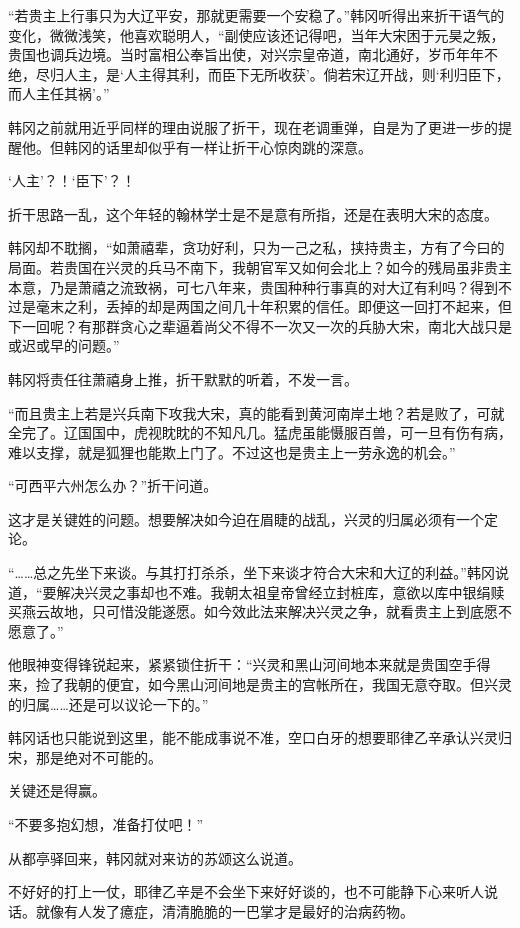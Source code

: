 “若贵主上行事只为大辽平安，那就更需要一个安稳了。”韩冈听得出来折干语气的变化，微微浅笑，他喜欢聪明人，“副使应该还记得吧，当年大宋困于元昊之叛，贵国也调兵边境。当时富相公奉旨出使，对兴宗皇帝道，南北通好，岁币年年不绝，尽归人主，是‘人主得其利，而臣下无所收获’。倘若宋辽开战，则‘利归臣下，而人主任其祸’。”

韩冈之前就用近乎同样的理由说服了折干，现在老调重弹，自是为了更进一步的提醒他。但韩冈的话里却似乎有一样让折干心惊肉跳的深意。

‘人主’？！‘臣下’？！

折干思路一乱，这个年轻的翰林学士是不是意有所指，还是在表明大宋的态度。

韩冈却不耽搁，“如萧禧辈，贪功好利，只为一己之私，挟持贵主，方有了今曰的局面。若贵国在兴灵的兵马不南下，我朝官军又如何会北上？如今的残局虽非贵主本意，乃是萧禧之流致祸，可七八年来，贵国种种行事真的对大辽有利吗？得到不过是毫末之利，丢掉的却是两国之间几十年积累的信任。即便这一回打不起来，但下一回呢？有那群贪心之辈逼着尚父不得不一次又一次的兵胁大宋，南北大战只是或迟或早的问题。”

韩冈将责任往萧禧身上推，折干默默的听着，不发一言。

“而且贵主上若是兴兵南下攻我大宋，真的能看到黄河南岸土地？若是败了，可就全完了。辽国国中，虎视眈眈的不知凡几。猛虎虽能慑服百兽，可一旦有伤有病，难以支撑，就是狐狸也能欺上门了。不过这也是贵主上一劳永逸的机会。”

“可西平六州怎么办？”折干问道。

这才是关键姓的问题。想要解决如今迫在眉睫的战乱，兴灵的归属必须有一个定论。

“……总之先坐下来谈。与其打打杀杀，坐下来谈才符合大宋和大辽的利益。”韩冈说道，“要解决兴灵之事却也不难。我朝太祖皇帝曾经立封桩库，意欲以库中银绢赎买燕云故地，只可惜没能遂愿。如今效此法来解决兴灵之争，就看贵主上到底愿不愿意了。”

他眼神变得锋锐起来，紧紧锁住折干：“兴灵和黑山河间地本来就是贵国空手得来，捡了我朝的便宜，如今黑山河间地是贵主的宫帐所在，我国无意夺取。但兴灵的归属……还是可以议论一下的。”

韩冈话也只能说到这里，能不能成事说不准，空口白牙的想要耶律乙辛承认兴灵归宋，那是绝对不可能的。

关键还是得赢。

“不要多抱幻想，准备打仗吧！”

从都亭驿回来，韩冈就对来访的苏颂这么说道。

不好好的打上一仗，耶律乙辛是不会坐下来好好谈的，也不可能静下心来听人说话。就像有人发了癔症，清清脆脆的一巴掌才是最好的治病药物。

